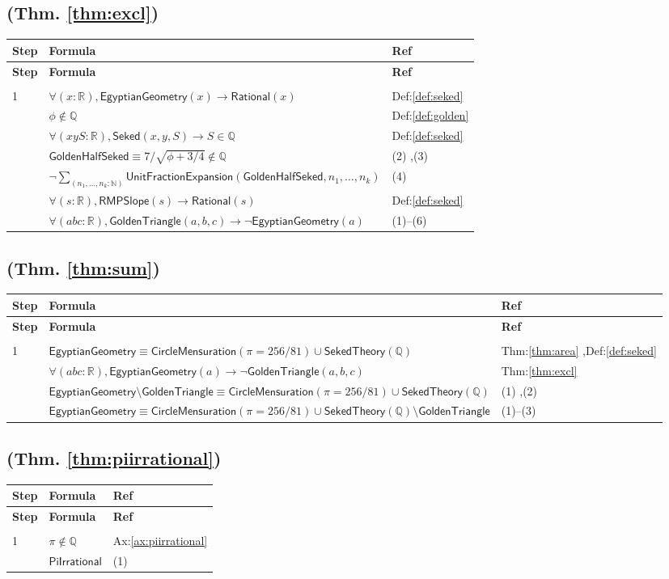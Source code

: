 \documentclass[12pt]{amsart}
\newcommand{\br}{,\allowbreak}
\newenvironment{prooftable}{%
	\renewcommand{\arraystretch}{1.2}%
	\setlength{\tabcolsep}{4pt}%
	\setlength{\arrayrulewidth}{0.05pt}
	\tiny
	\sloppy
	\begin{longtable}{
			|>{\centering\arraybackslash}m{0.7cm}|
			>{\raggedright\centering\arraybackslash}m{0.70\textwidth}|
			>{\centering\arraybackslash}m{3.5cm}|  %
		}%
		\hline
		\textbf{Step} & \centering\textbf{Formula} & \textbf{Ref} \\
		\hline
		\endfirsthead
		\hline
		\textbf{Step} & \centering\textbf{Formula} & \textbf{Ref} \\
		\hline
		\endhead
		\hline
		\multicolumn{3}{r}{\textit{Continued on next page}} \\
		\endfoot
		\hline
		\endlastfoot
	}{%
	\end{longtable}%
}
\begin{document}
\subsection{(Thm. \ref{thm:excl})}
\begin{prooftable}
	1 & $\forall (x : \mathbb{R}) \br  \textsf{EgyptianGeometry}(x) \to \textsf{Rational}(x)$ & Def:\ref{def:seked} \\[3pt]  \hline
	2 & $\phi \notin \mathbb{Q}$ & Def:\ref{def:golden} \\[3pt]  \hline
	3 & $\forall (x y S : \mathbb{R}) \br  \textsf{Seked}(x \br y \br S) \to S \in \mathbb{Q}$ & Def:\ref{def:seked} \\[3pt]  \hline
	4 & $\textsf{GoldenHalfSeked} \equiv 7/\sqrt{\phi+3/4} \notin \mathbb{Q}$ & (2) \br (3) \\[3pt]  \hline
	5 & $\neg \sum_{(n_1 \br \ldots \br n_k : \mathbb{N})} \textsf{UnitFractionExpansion}(\textsf{GoldenHalfSeked} \br  n_1 \br \ldots \br n_k)$ & (4) \\[3pt]  \hline
	6 & $\forall (s : \mathbb{R}) \br  \textsf{RMPSlope}(s) \to \textsf{Rational}(s)$ & Def:\ref{def:seked} \\[3pt]  \hline
	7 & $\forall (a b c : \mathbb{R}) \br  \textsf{GoldenTriangle}(a \br b \br c) \to \neg \textsf{EgyptianGeometry}(a)$ & (1)--(6)
\end{prooftable}


\subsection{(Thm. \ref{thm:sum})}
\begin{prooftable}
	1 & $\textsf{EgyptianGeometry} \equiv \textsf{CircleMensuration}(\pi=256/81) \cup \textsf{SekedTheory}(\mathbb{Q})$ & Thm:\ref{thm:area} \br  Def:\ref{def:seked} \\[3pt]  \hline
	2 & $\forall (abc:\mathbb{R}) \br  \textsf{EgyptianGeometry}(a) \to \neg \textsf{GoldenTriangle}(a \br b \br c)$ & Thm:\ref{thm:excl} \\[3pt]  \hline
	3 & $\textsf{EgyptianGeometry} \setminus \textsf{GoldenTriangle} \equiv \textsf{CircleMensuration}(\pi=256/81) \cup \textsf{SekedTheory}(\mathbb{Q})$ & (1) \br (2) \\[3pt]  \hdashline
	& $\textsf{EgyptianGeometry} \equiv \textsf{CircleMensuration}(\pi=256/81) \cup \textsf{SekedTheory}(\mathbb{Q}) \setminus \textsf{GoldenTriangle}$ & (1)--(3)
\end{prooftable}

\subsection{(Thm. \ref{thm:piirrational})}
\begin{prooftable}
	1 & $\pi \notin \mathbb{Q}$ & Ax:\ref{ax:piirrational} \\[3pt] \hdashline
	& $\textsf{PiIrrational}$ & (1)
\end{prooftable}
\end{document}
